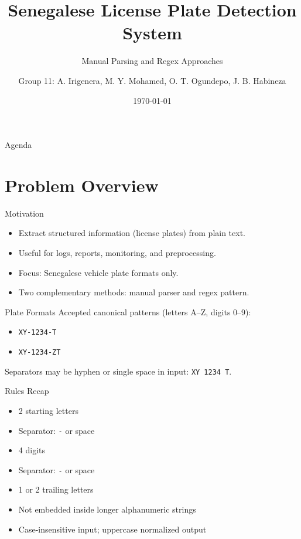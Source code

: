 \documentclass[aspectratio=169]{beamer}
\title[Plate Detection]{Senegalese License Plate Detection System}
\subtitle{Manual Parsing and Regex Approaches}
\author{Group 11: A. Irigenera, M. Y. Mohamed, O. T. Ogundepo, J. B. Habineza}
\institute{AIMS Rwanda}
\date{\today}
\newcommand{\code}[1]{\texttt{#1}}
\begin{document}
\begin{frame}
  \titlepage
\end{frame}

\begin{frame}{Agenda}
  \tableofcontents[hidesubsections]
\end{frame}

\section{Problem Overview}

\begin{frame}{Motivation}
  \begin{itemize}
    \item Extract structured information (license plates) from plain text.
    \item Useful for logs, reports, monitoring, and preprocessing.
    \item Focus: Senegalese vehicle plate formats only.
    \item Two complementary methods: manual parser and regex pattern.
  \end{itemize}
\end{frame}

\begin{frame}{Plate Formats}
  Accepted canonical patterns (letters A--Z, digits 0--9):
  \begin{itemize}
    \item \code{XY-1234-T}
    \item \code{XY-1234-ZT}
  \end{itemize}
  Separators may be hyphen or single space in input: \code{XY 1234 T}.
\end{frame}

\begin{frame}{Rules Recap}
  \begin{itemize}
    \item 2 starting letters
    \item Separator: \code{-} or space
    \item 4 digits
    \item Separator: \code{-} or space
    \item 1 or 2 trailing letters
    \item Not embedded inside longer alphanumeric strings
    \item Case-insensitive input; uppercase normalized output
  \end{itemize}
\end{frame}
\end{document}
